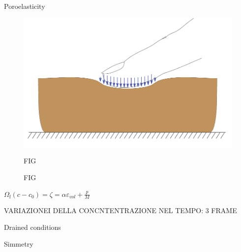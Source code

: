 \documentclass[aspectratio=169,xcolor=dvipsnames]{beamer}
\begin{document}
\begin{frame}{Poroelasticity}
	
	\begin{figure}
		\begin{minipage}{\linewidth}
			\begin{minipage}{0.3\linewidth}\centering
				\includegraphics[width=\linewidth]{punch.pdf}
			\end{minipage}\hfill
			\begin{minipage}{0.3\linewidth}\centering
				FIG
			\end{minipage}\hfill
			\begin{minipage}{0.3\linewidth}\centering
FIG
			\end{minipage}
		\end{minipage}
	\end{figure}

	\tiny{$\Omega_{\mathrm{f}}\left(c-c_{0}\right)=\zeta=\alpha \varepsilon_{v o l}+\frac{p}{M}$}

VARIAZIONEI DELLA CONCNTENTRAZIONE NEL TEMPO: 3 FRAME

\end{frame}

\begin{frame}{Drained conditions}

\end{frame}


\begin{frame}{Simmetry}
	
\end{frame}
\end{document}
